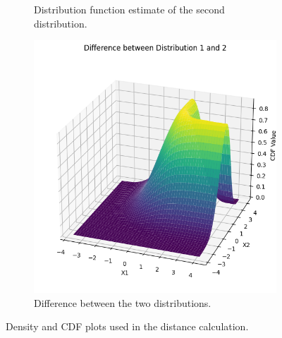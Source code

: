 \documentclass[%
a4paper,							
11pt,								
bibliography=totoc,						
abstracton=true					
]
{scrartcl}
\theoremstyle{plain}
\theoremstyle{definition}
\theoremstyle{remark}
\newcommand{\1}{\mathbbm{1}}
\begin{document}
\begin{figure}
\begin{subfigure}{0.49\textwidth}
        \caption{Distribution function estimate of the second distribution.}
        \label{fig:dist2}
    \end{subfigure}
     
    \vfill
    \begin{subfigure}{0.49\textwidth}
        \centering
        \includegraphics[width=\textwidth]{3Theory/pictures/diffDist1and2.png}
        \caption{Difference between the two distributions.}
        \label{fig:diffDist1and2}
    \end{subfigure}
    \caption{Density and CDF plots used in the distance calculation.}
    \label{fig:ApproxWasserstein}
\end{figure}


\newpage
\end{document}
